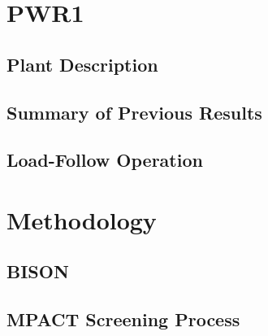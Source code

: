 \documentclass[edeposit,fullpage]{uiucthesis2009}
\begin{document}
\chapter{PWR1}

\section{Plant Description}

\section{Summary of Previous Results}

\section{Load-Follow Operation}

\chapter{Methodology}

\section{BISON}

\section{MPACT Screening Process}
\end{document}
